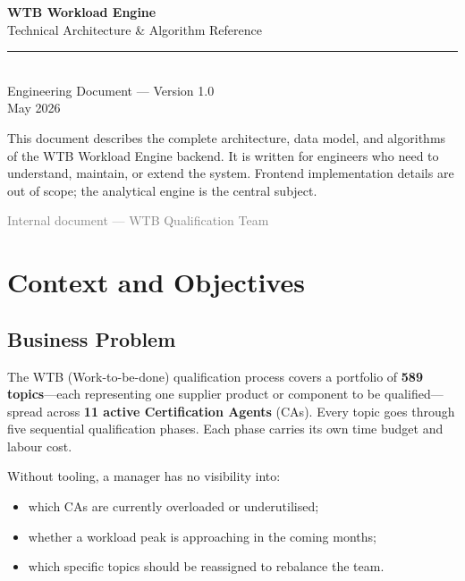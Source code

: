 \documentclass[12pt,a4paper]{report}
\begin{document}
\begin{titlepage}
  \centering
  \vspace*{2cm}
  {\huge\bfseries\color{primary} WTB Workload Engine}\\[0.6cm]
  {\Large Technical Architecture \& Algorithm Reference}\\[0.3cm]
  \rule{\linewidth}{0.5pt}\\[1cm]
  {\large Engineering Document — Version 1.0}\\[0.5cm]
  {\large May 2026}\\[3cm]

  \begin{tcolorbox}[notebox, title={Scope of this document}]
    This document describes the complete architecture, data model, and
    algorithms of the WTB Workload Engine backend. It is written for
    engineers who need to understand, maintain, or extend the system.
    Frontend implementation details are out of scope; the analytical
    engine is the central subject.
  \end{tcolorbox}

  \vfill
  {\small\textcolor{gray}{Internal document --- WTB Qualification Team}}
\end{titlepage}

\tableofcontents
\clearpage

\chapter{Context and Objectives}

\section{Business Problem}

The WTB (Work-to-be-done) qualification process covers a portfolio of
\textbf{589 topics}---each representing one supplier product or component
to be qualified---spread across \textbf{11 active Certification Agents}
(CAs). Every topic goes through five sequential qualification phases.
Each phase carries its own time budget and labour cost.

Without tooling, a manager has no visibility into:
\begin{itemize}
  \item which CAs are currently overloaded or underutilised;
  \item whether a workload peak is approaching in the coming months;
  \item which specific topics should be reassigned to rebalance the team.
\end{itemize}
\end{document}
